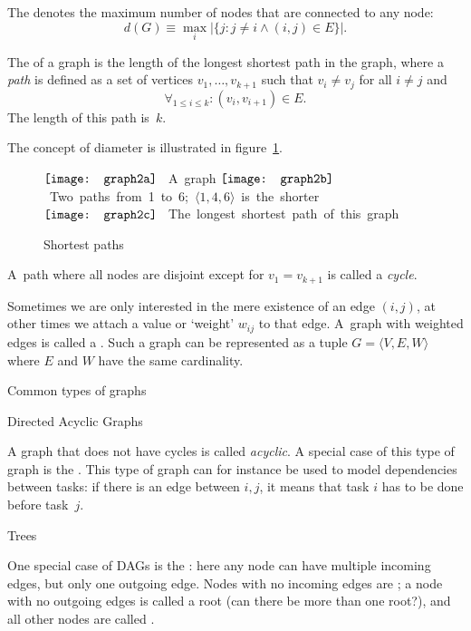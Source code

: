 \begin{definition}
The
 denotes the maximum number of nodes that are
connected to any node:
\[ 
  d(G)\equiv \max_i 
  \left|\{j\colon j\not=i\wedge (i,j)\in E\}\right|.
\]
\end{definition}

\begin{definition}
The  of a graph is the length of the longest
shortest path
in the graph, where a \emph{path}
is defined as a set of vertices
$v_1,\ldots, v_{k+1}$ such that $v_i\not=v_j$ for all $i\not=j$ and
\[ \forall_{1\leq i\leq k}\colon (v_i,v_{i+1})\in E. \]
The length of this path is~$k$.
\end{definition}
The concept of diameter is illustrated
in figure~\ref{fig:graph2}.

\begin{figure}[ht]
  \hbox{$\vcenter{\hbox{%
        \texttt{[image: graph2a]}
    }}$%
    A graph}
  \hbox{$\vcenter{\hbox{%
        \texttt{[image: graph2b]}
    }}$%
    Two paths from 1 to 6; $\langle 1,4,6\rangle$ is the shorter}
  \hbox{$\vcenter{\hbox{%
        \texttt{[image: graph2c]}
    }}$%
    The longest shortest path of this graph}
  \caption{Shortest paths}
  \label{fig:graph2}
\end{figure}

A~path where all nodes are disjoint
except for $v_1=v_{k+1}$ is called a \emph{cycle}.

Sometimes we are only interested in the mere existence of an edge
$(i,j)$, at other times we attach a value or `weight' $w_{ij}$ to that
edge. A~graph with weighted edges is called a . Such a graph can be represented as a tuple $G=\langle
V,E,W\rangle$ where $E$ and $W$ have the same cardinality.

 {Common types of graphs}

 {Directed Acyclic Graphs}

A graph that does not have cycles is called
\emph{acyclic}. A special case of this type of
graph is the . This type of graph can for instance be
used to model dependencies between tasks: if there is an edge between
$i,j$, it means that task $i$ has to be done before task~$j$.

 {Trees}

One special case of \acp{DAG} is the : here any
node can have multiple incoming edges, but only one outgoing
edge. Nodes with no incoming edges are ; a node
with no outgoing edges is called a root (can there be more than one
root?), and all other nodes are called .

